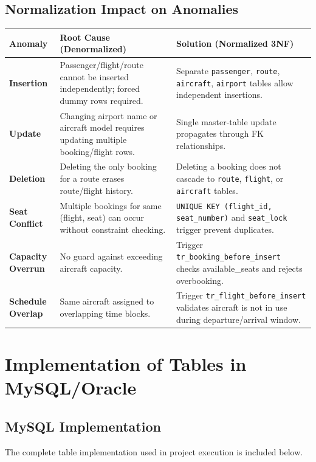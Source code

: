 \documentclass[12pt, a4paper]{article}
\begin{document}
\subsection{Normalization Impact on Anomalies}
\begin{center}
\begin{longtable}{|p{} |p{} |p{}|}
	\hline
	\textbf{Anomaly} & \textbf{Root Cause (Denormalized)} & \textbf{Solution (Normalized 3NF)} \\
	\hline
	\textbf{Insertion} & Passenger/flight/route cannot be inserted independently; forced dummy rows required. & Separate \texttt{passenger}, \texttt{route}, \texttt{aircraft}, \texttt{airport} tables allow independent insertions. \\
	\hline
	\textbf{Update} & Changing airport name or aircraft model requires updating multiple booking/flight rows. & Single master-table update propagates through FK relationships. \\
	\hline
	\textbf{Deletion} & Deleting the only booking for a route erases route/flight history. & Deleting a booking does not cascade to \texttt{route}, \texttt{flight}, or \texttt{aircraft} tables. \\
	\hline
	\textbf{Seat Conflict} & Multiple bookings for same (flight, seat) can occur without constraint checking. & \texttt{UNIQUE KEY (flight\_id, seat\_number)} and \texttt{seat\_lock} trigger prevent duplicates. \\
	\hline
	\textbf{Capacity Overrun} & No guard against exceeding aircraft capacity. & Trigger \texttt{tr\_booking\_before\_insert} checks available\_seats and rejects overbooking. \\
	\hline
	\textbf{Schedule Overlap} & Same aircraft assigned to overlapping time blocks. & Trigger \texttt{tr\_flight\_before\_insert} validates aircraft is not in use during departure/arrival window. \\
	\hline
\end{longtable}

\end{center}
\newpage
\section{Implementation of Tables in MySQL/Oracle}

\subsection{MySQL Implementation}
The complete table implementation used in project execution is included below.
\end{document}
